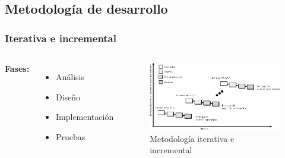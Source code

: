 \documentclass[9pt]{beamer}
\begin{document}
    \subsection{Metodología de desarrollo}
    \begin{frame}
        \frametitle{Iterativa e incremental}
              
        \begin{columns}
            \textbf{Fases:}
            \bigskip
            \begin{itemize}
                \item Análisis
                \item Diseño
                \item Implementación
                \item Pruebas
            \end{itemize}
    
            \begin{figure}
                \includegraphics[width=\textwidth]{assets/iedevelopment-v2.eps}
                \caption{Metodología iterativa e incremental~\citet{Pressman2009}}
            \end{figure}
        \end{columns}
    
    \end{frame}

\end{document}
